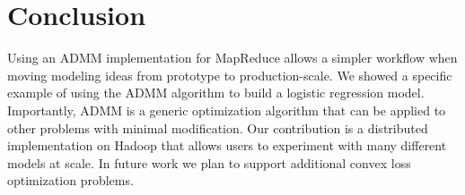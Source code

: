 \documentclass[10pt, conference, compsocconf]{IEEEtran}
\begin{document}
\section{Conclusion}\label{sec:conc}
Using an ADMM implementation for MapReduce allows a simpler workflow when moving modeling ideas from prototype to production-scale.  We showed a specific example of using the ADMM algorithm to build a logistic regression model.  Importantly, ADMM is a generic optimization algorithm that can be applied to other problems with minimal modification.  Our contribution is a distributed implementation on Hadoop that allows users to experiment with many different models at scale.  In future work we plan to support additional convex loss optimization problems.










%



\end{document}
